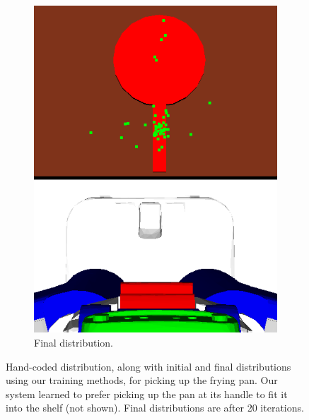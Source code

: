 \begin{figure}[t]
\begin{subfigure}[b]{0.25\linewidth}
    \includegraphics[width=\textwidth]{images/frying_final.png}
    \caption{Final distribution.}
  \end{subfigure}
  \caption{\small{Hand-coded distribution, along with initial and final distributions using our training methods,
for picking up the frying pan. Our system learned to prefer picking up the pan at its handle to fit it into the
shelf (not shown). Final distributions are after 20 iterations.}}
  \label{fig:frying}
\end{figure}

